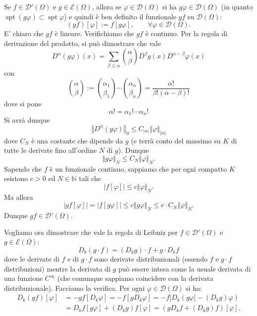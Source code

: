 \documentclass[italian,a4paper,oneside,headinclude]{scrbook}
\renewcommand{\phi}{\varphi}
\newcommand{\D}{\mathcal D}
\newcommand{\E}{\mathcal E}
\newcommand{\NN}{\mathbb N}
\newcommand{\abs}[1]{{\left|#1\right|}}
\newcommand{\Abs}[1]{{\left\Vert #1\right\Vert}}
\newcommand{\defeq}{:=}
\DeclareMathOperator{\spt}{spt}
\begin{document}
Se $f\in \D'(\Omega)$ e $g\in \E(\Omega)$, allora
se $\phi\in \D(\Omega)$ si ha $g\phi \in \D(\Omega)$ (in quanto
$\spt(g\phi)\subset \spt \phi$) e quindi
è ben definito il funzionale $gf$ su $\D(\Omega)$:
\[
  (gf)[\phi] \defeq f[g\phi],\qquad \forall\phi\in \D(\Omega).
\]
E' chiaro che $gf$ è lineare. Verifichiamo che $gf$ è
continuo. Per la regola di derivazione del prodotto, si può
dimostrare che vale
\[
D^\alpha (g\phi)(x) = \sum_{\beta\le \alpha} {\alpha\choose\beta}D^\beta g(x) D^{\alpha-\beta} \phi(x)
\]
con
\[
  {\alpha \choose \beta}
  \defeq {\alpha_1 \choose \beta_1}\cdots{\alpha_n \choose \beta_n}
  = \frac{\alpha!}{\beta!(\alpha-\beta)!}
\]
dove si pone
\[
\alpha! = \alpha_1!\cdots \alpha_n!
\]
Si avrà dunque
\[
\Abs{D^\alpha (g\phi)}_0 \le C_{\abs{\alpha}} \Abs{ \phi}_{\abs{\alpha}}
\]
dove $C_N$ è una costante che dipende da $g$ (e terrà conto del
massimo su $K$ di tutte le derivate fino all'ordine $N$ di $g$).
Dunque
\[
\Abs{g\phi}_N \le C_N \Abs{\phi}_N.
\]
Sapendo che $f$ è un funzionale continuo, sappiamo che per ogni
compatto $K$ esistono $c>0$ ed $N\in \NN$ tali che
\[
\abs{f[\phi]} \le c \Abs{\phi}_N.
\]
Ma allora
\[
\abs{gf[\phi]} = \abs{f[g\phi]} \le c \Abs{g\phi}_N \le c\cdot C_N \Abs{\phi}_N.
\]
Dunque $gf\in \D'(\Omega)$.

Vogliamo ora dimostrare che vale la regola di Leibniz per
$f\in\D'(\Omega)$ e $g\in \E(\Omega)$:
\[
  D_k (g\cdot f) = (D_k g) \cdot f + g \cdot D_k f
\]
dove le derivate di $f$ e di $g\cdot f$ sono derivate distribuzionali
(essendo $f$ e $g\cdot f$ distribuzioni) mentre la derivata di $g$ può
essere intesa come la
usuale derivata di una funzione $C^\infty$ (che comunque sappiamo
coincidere con la derivata distribuzionale).
Facciamo la verifica. Per ogni $\phi\in\D(\Omega)$ si ha:
\begin{align*}
D_k (gf)[\phi]
& = -gf[D_k \phi]
= -f[g D_k \phi]
= -f[D_k(g\phi]-(D_k g) \phi)\\
& = D_k f[g\phi] + (D_k g) f[\phi]
  = (g D_k f + (D_k g)f)[\phi].
\end{align*}
\end{document}
